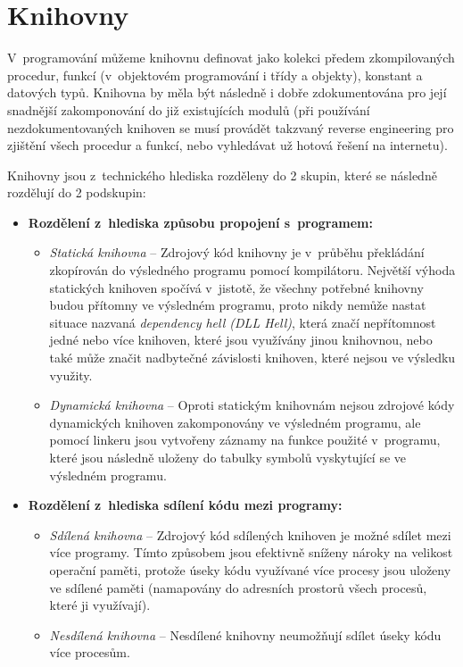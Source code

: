 \chapter{Knihovny}
V~programování můžeme knihovnu definovat jako kolekci předem zkompilovaných procedur, funkcí (v~objektovém programování i třídy a objekty), konstant a datových typů. Knihovna by měla být následně i dobře zdokumentována pro její snadnější zakomponování do již existujících modulů (při používání nezdokumentovaných knihoven se musí provádět takzvaný reverse engineering pro zjištění všech procedur a funkcí, nebo vyhledávat už hotová řešení na internetu). 
\par
Knihovny jsou z~technického hlediska rozděleny do 2 skupin, které se následně rozdělují do 2 podskupin:
	\begin{itemize}
	\item \textbf{Rozdělení z~hlediska způsobu propojení s~programem:}
		\begin{itemize}
		\item \textit{Statická knihovna} -- Zdrojový kód knihovny je v~průběhu překládání zkopírován do výsledného programu pomocí kompilátoru. Největší výhoda statických knihoven spočívá v~jistotě, že všechny potřebné knihovny budou přítomny ve výsledném programu, proto nikdy nemůže nastat situace nazvaná \textit{dependency hell (DLL Hell)}, která značí nepřítomnost jedné nebo více knihoven, které jsou využívány jinou knihovnou, nebo také může značit nadbytečné závislosti knihoven, které nejsou ve výsledku využity.
		\item \textit{Dynamická knihovna} -- Oproti statickým knihovnám nejsou zdrojové kódy dynamických knihoven zakomponovány ve výsledném programu, ale pomocí linkeru jsou vytvořeny záznamy na funkce použité v~programu, které jsou následně uloženy do tabulky symbolů vyskytující se ve výsledném programu.
		\end{itemize}
	\item \textbf{Rozdělení z~hlediska sdílení kódu mezi programy:}
		\begin{itemize}
		\item \textit{Sdílená knihovna} -- Zdrojový kód sdílených knihoven je možné sdílet mezi více programy. Tímto způsobem jsou efektivně sníženy nároky na velikost operační paměti, protože úseky kódu využívané více procesy jsou uloženy ve sdílené paměti (namapovány do adresních prostorů všech procesů, které ji využívají).
		\item \textit{Nesdílená knihovna} -- Nesdílené knihovny neumožňují sdílet úseky kódu více procesům.
		\end{itemize}
	\end{itemize}
